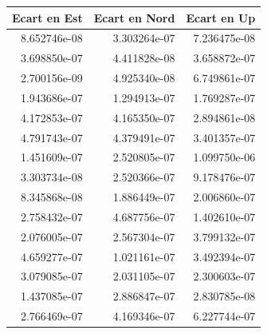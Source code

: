 \begin{tabular}{rrr}
\toprule
Ecart en Est & Ecart en Nord &  Ecart en Up \\
\midrule
8.652746e-08 &  3.303264e-07 & 7.236475e-08 \\
3.698850e-07 &  4.411828e-08 & 3.658872e-07 \\
2.700156e-09 &  4.925340e-08 & 6.749861e-07 \\
1.943686e-07 &  1.294913e-07 & 1.769287e-07 \\
4.172853e-07 &  4.165350e-07 & 2.894861e-08 \\
4.791743e-07 &  4.379491e-07 & 3.401357e-07 \\
1.451609e-07 &  2.520805e-07 & 1.099750e-06 \\
3.303734e-08 &  2.520366e-07 & 9.178476e-07 \\
8.345868e-08 &  1.886449e-07 & 2.006860e-07 \\
2.758432e-07 &  4.687756e-07 & 1.402610e-07 \\
2.076005e-07 &  2.567304e-07 & 3.799132e-07 \\
4.659277e-07 &  1.021161e-07 & 3.492394e-07 \\
3.079085e-07 &  2.031105e-07 & 2.300603e-07 \\
1.437085e-07 &  2.886847e-07 & 2.830785e-08 \\
2.766469e-07 &  4.169346e-07 & 6.227744e-07 \\
\bottomrule
\end{tabular}
